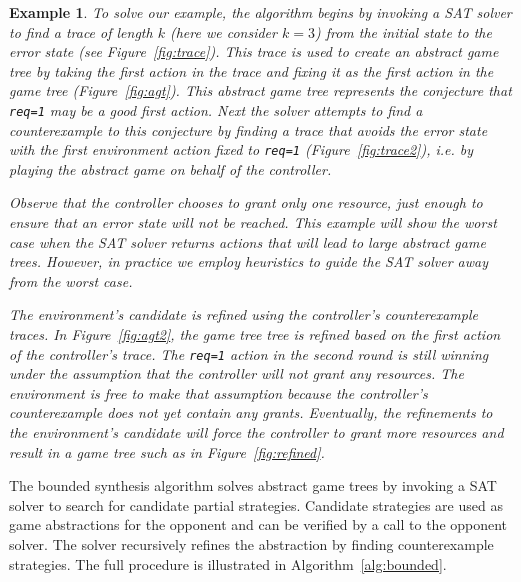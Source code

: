 \documentclass{llncs}
\newtheorem*{exmp}{Example}
\begin{document}
\begin{exmp}

    To solve our example, the algorithm begins by invoking a SAT solver to find
    a trace of length $k$ (here we consider $k=3$) from the initial state to
    the error state (see Figure~\ref{fig:trace}). This trace is used to create
    an abstract game tree by taking the first action in the trace and fixing it
    as the first action in the game tree (Figure~\ref{fig:agt}).  This abstract
    game tree represents the conjecture that \texttt{req=1} may be a good first
    action.  Next the solver attempts to find a counterexample to this
    conjecture by finding a trace that avoids the error state with the first
    environment action fixed to \texttt{req=1} (Figure~\ref{fig:trace2}), i.e.
    by playing the abstract game on behalf of the controller.
    
    Observe that the controller chooses to grant only one resource, just enough
    to ensure that an error state will not be reached. This example will show
    the worst case when the SAT solver returns actions that will lead to large
    abstract game trees. However, in practice we employ heuristics to guide the
    SAT solver away from the worst case.

    The environment's candidate is refined using the controller's
    counterexample traces. In Figure~\ref{fig:agt2}, the game tree tree is
    refined based on the first action of the controller's trace. The
    \texttt{req=1} action in the second round is still winning under the
    assumption that the controller will not grant any resources. The
    environment is free to make that assumption because the controller's
    counterexample does not yet contain any grants. Eventually, the refinements
    to the environment's candidate will force the controller to grant more
    resources and result in a game tree such as in Figure~\ref{fig:refined}.
    
\end{exmp}

The bounded synthesis algorithm solves abstract game trees by invoking a SAT
solver to search for candidate partial strategies. Candidate strategies are
used as game abstractions for the opponent and can be verified by a call to the
opponent solver. The solver recursively refines the abstraction by finding
counterexample strategies. The full procedure is illustrated in
Algorithm~\ref{alg:bounded}.
\end{document}
